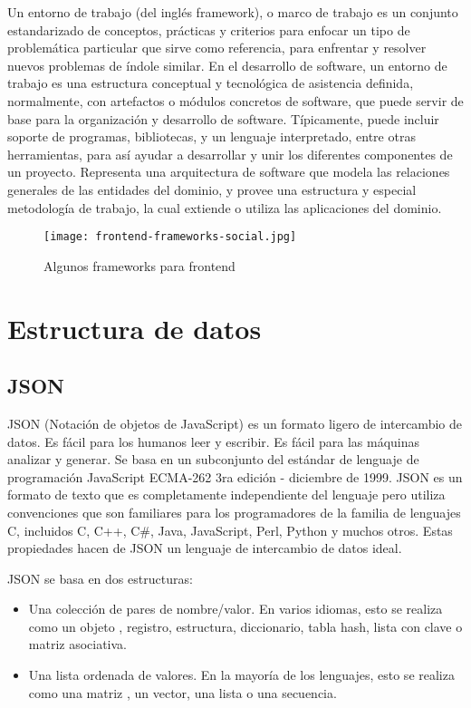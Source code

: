 \begin{enumerate}
\cite{wiki}Un entorno de trabajo (del inglés framework), o marco de trabajo es un conjunto estandarizado
de conceptos, prácticas y criterios para enfocar un tipo de problemática particular que sirve como
referencia, para enfrentar y resolver nuevos problemas de índole similar.
En el desarrollo de software, un entorno de trabajo es una estructura conceptual y tecnológica
de asistencia definida, normalmente, con artefactos o módulos concretos de software, que puede
servir de base para la organización y desarrollo de software. Típicamente, puede incluir soporte
de programas, bibliotecas, y un lenguaje interpretado, entre otras herramientas, para así ayudar a
desarrollar y unir los diferentes componentes de un proyecto.
Representa una arquitectura de software que modela las relaciones generales de las entidades del
dominio, y provee una estructura y especial metodología de trabajo, la cual extiende o utiliza las
aplicaciones del dominio.

\begin{figure}[H]
	\center
	\texttt{[image: frontend-frameworks-social.jpg]}
	\caption{Algunos frameworks para frontend}
	\label{fig:super}
\end{figure}

\section{Estructura de datos}

\subsection{JSON}
\cite{json} JSON (Notación de objetos de JavaScript) es un formato ligero de intercambio de datos. Es fácil para los humanos leer y escribir. Es fácil para las máquinas analizar y generar. Se basa en un subconjunto del estándar de lenguaje de programación JavaScript ECMA-262 3ra edición - diciembre de 1999. JSON es un formato de texto que es completamente independiente del lenguaje pero utiliza convenciones que son familiares para los programadores de la familia de lenguajes C, incluidos C, C++, C#, Java, JavaScript, Perl, Python y muchos otros. Estas propiedades hacen de JSON un lenguaje de intercambio de datos ideal.

JSON se basa en dos estructuras:

\begin{itemize}
	\item Una colección de pares de nombre/valor. En varios idiomas, esto se realiza como un objeto , registro, estructura, diccionario, tabla hash, lista con clave o matriz asociativa.
	\item Una lista ordenada de valores. En la mayoría de los lenguajes, esto se realiza como una matriz , un vector, una lista o una secuencia.
\end{itemize}


\end{enumerate}
